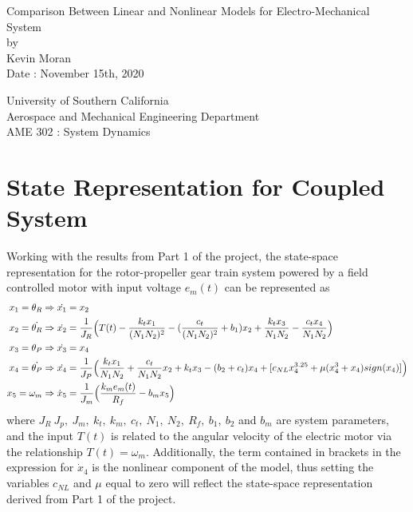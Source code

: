 \documentclass[letterpaper,12pt]{article}
\begin{document}
\begin{titlepage}
 \begin{center}
 \vspace*{1in}
{\Huge Comparison Between Linear and Nonlinear Models for Electro-Mechanical System}\\
    \bigskip
    by\\
    \bigskip
    {\Large Kevin Moran} \\
    \bigskip
    Date : November 15th, 2020

    \bigskip\bigskip\bigskip
    University of Southern California\\
    Aerospace and Mechanical Engineering Department\\
    AME 302 : System Dynamics
 \end{center}
\end{titlepage}


\section{State Representation for Coupled System}
Working with the results from Part 1 of the project, the state-space representation for the rotor-propeller gear train system powered by a field controlled motor with input voltage $e_m(t)$ can be represented as 
\begin{align*}
    x_1 = \theta_R & \Rightarrow \dot{x_1} = x_2\\
    x_2 = \dot{\theta_R} & \Rightarrow \dot{x_2} = {\small \frac{1}{J_R} \Big(T(t) -\frac{k_tx_1}{(N_1N_2)^2} - (\frac{c_t}{(N_1N_2)^2} + b_1)x_2 + \frac{k_tx_3}{N_1N_2} -\frac{c_tx_4}{N_1N_2} \Big)}\\
    x_3 = \theta_P & \Rightarrow \dot{x_3} = x_4\\
    x_4 = \dot{\theta_P} & \Rightarrow \dot{x_4} = {\small \frac{1}{J_P} \Big( \frac{k_tx_1}{N_1N_2} + \frac{c_t}{N_1N_2}x_2 + k_tx_3 - (b_2 + c_t)x_4 + [c_{NL}x_4^{3.25} + \mu(x_4^3 + x_4)sign(x_4)] \Big)}\\
    x_5 = \omega_m & \Rightarrow \dot{x}_5 = \frac{1}{J_m} \Big(\frac{k_me_m(t)}{R_f} - b_mx_5 \Big)
\end{align*}
where $J_R\ J_p,\ J_m,\ k_t,\ k_m,\ c_t,\ N_1,\ N_2,\ R_f,\ b_1,\ b_2$ and $b_m$ are system parameters, and the input $T(t)$ is related to the angular velocity of the electric motor via the relationship $T(t) = \omega_m$. Additionally, the term contained in brackets in the expression for $\dot{x}_4$ is the nonlinear component of the model, thus setting the variables $c_{NL}$ and $\mu$ equal to zero will reflect the state-space representation derived from Part 1 of the project.
\end{document}
